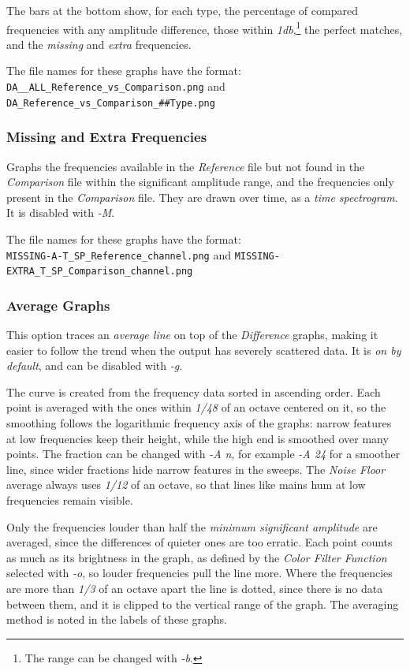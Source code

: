\documentclass[10pt,a4paper]{report}
\newcommand{\db}[1]{\textit{\mbox{#1\acrshort{db}}}}
\begin{document}
\begin{appendices}
The bars at the bottom show, for each type, the percentage of compared frequencies with any amplitude difference, those within \db{1},\footnote{The range can be changed with \textit{-b}.} the perfect matches, and the \textit{missing} and \textit{extra} frequencies.

The file names for these graphs have the format:\\ \nolinkurl{DA__ALL_Reference_vs_Comparison.png} and \nolinkurl{DA_Reference_vs_Comparison_##Type.png}

\subsubsection{Missing and Extra Frequencies} 

Graphs the frequencies available in the \textit{Reference} file but not found in the \textit{Comparison} file within the significant amplitude range, and the frequencies only present in the \textit{Comparison} file. They are drawn over time, as a \textit{time spectrogram}. It is disabled with \textit{-M}.

The file names for these graphs have the format:\\ \nolinkurl{MISSING-A-T_SP_Reference_channel.png} and \nolinkurl{MISSING-EXTRA_T_SP_Comparison_channel.png}

\subsubsection{Average Graphs}
\label{averaged}

This option traces an \textit{average line} on top of the \textit{Difference} graphs, making it easier to follow the trend when the output has severely scattered data. It is \textit{on by default}, and can be disabled with \textit{-g}.

The curve is created from the frequency data sorted in ascending order. Each point is averaged with the ones within \textit{1/48} of an octave centered on it, so the smoothing follows the logarithmic frequency axis of the graphs: narrow features at low frequencies keep their height, while the high end is smoothed over many points. The fraction can be changed with \textit{-A n}, for example \textit{-A 24} for a smoother line, since wider fractions hide narrow features in the sweeps. The \textit{Noise Floor} average always uses \textit{1/12} of an octave, so that lines like mains hum at low frequencies remain visible.

Only the frequencies louder than half the \textit{minimum significant amplitude} are averaged, since the differences of quieter ones are too erratic. Each point counts as much as its brightness in the graph, as defined by the \textit{Color Filter Function} selected with \textit{-o}, so louder frequencies pull the line more. Where the frequencies are more than \textit{1/3} of an octave apart the line is dotted, since there is no data between them, and it is clipped to the vertical range of the graph. The averaging method is noted in the labels of these graphs.


\end{appendices}
\end{document}
